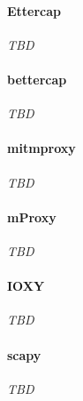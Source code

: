 \paragraph{Ettercap} \emph{TBD}
\paragraph{bettercap} \emph{TBD}
\paragraph{mitmproxy} \emph{TBD}
\paragraph{mProxy} \emph{TBD}
\paragraph{IOXY} \emph{TBD}
\paragraph{scapy} \emph{TBD}


